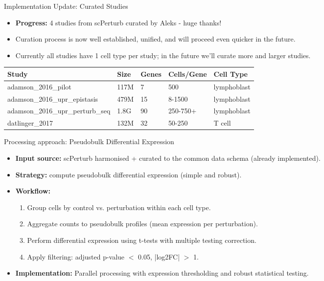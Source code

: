 \documentclass[handout]{beamer}
\begin{document}
\begin{frame}{Implementation Update: Curated Studies}
    \begin{itemize}
        \item \textbf{Progress:} 4 studies from scPerturb curated by Aleks - huge thanks!
        \item Curation process is now well established, unified, and will proceed even quicker in the future.
        \item Currently all studies have 1 cell type per study; in the future we'll curate more and larger studies.
    \end{itemize}
    
    \vspace{0.5em}
    \fontsize{6}{7}\selectfont
    \begin{tabular}{@{}p{3.5cm}p{1cm}p{1.2cm}p{1.5cm}p{1.5cm}@{}}
        \toprule
        \textbf{Study} & \textbf{Size} & \textbf{Genes} & \textbf{Cells/Gene} & \textbf{Cell Type} \\
        \midrule
        adamson\_2016\_pilot & 117M & 7 & 500 & lymphoblast \\
        adamson\_2016\_upr\_epistasis & 479M & 15 & 8-1500 & lymphoblast \\
        adamson\_2016\_upr\_perturb\_seq & 1.8G & 90 & 250-750+ & lymphoblast \\
        datlinger\_2017 & 132M & 32 & 50-250 & T cell \\
        \bottomrule
    \end{tabular}
\end{frame}

\begin{frame}{Processing approach: Pseudobulk Differential Expression}
    \begin{itemize}
        \item \textbf{Input source:} scPerturb harmonised + curated to the common data schema (already implemented).
        \item \textbf{Strategy:} compute pseudobulk differential expression (simple and robust).
        \item \textbf{Workflow:}
        \begin{enumerate}
            \item Group cells by control vs. perturbation within each cell type.
            \item Aggregate counts to pseudobulk profiles (mean expression per perturbation).
            \item Perform differential expression using t-tests with multiple testing correction.
            \item Apply filtering: adjusted p-value $<$ 0.05, |log2FC| $>$ 1.
        \end{enumerate}
        \item \textbf{Implementation:} Parallel processing with expression thresholding and robust statistical testing.
    \end{itemize}
\end{frame}
\end{document}
